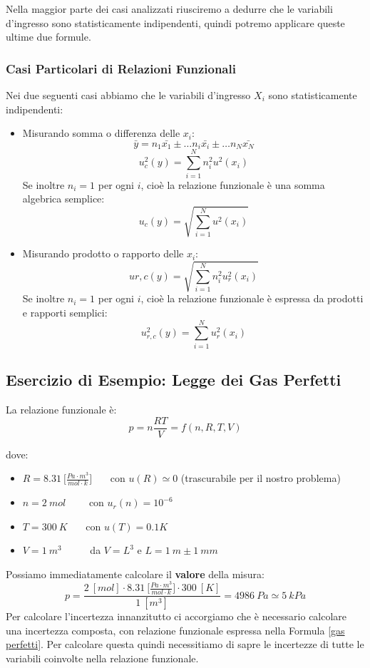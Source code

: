 \documentclass[a4paper,11pt]{report}
\begin{document}
Nella maggior parte dei casi analizzati riusciremo a dedurre che le variabili d'ingresso sono statisticamente indipendenti, quindi potremo applicare queste ultime due formule.
\subsubsection{Casi Particolari di Relazioni Funzionali}
Nei due seguenti casi abbiamo che le variabili d'ingresso $X_i$ sono statisticamente indipendenti:
\begin{itemize}
  \item Misurando somma o differenza delle $x_i$:
  $$
    \bar{y} = n_1\bar{x_1}\pm\ldots n_i\bar{x_i}\pm\ldots n_N\bar{x_N}
  $$
  $$
    u^2_c(y) = \sum^N_{i = 1}n_i^2 u^2(x_i)
  $$
  Se inoltre $n_i = 1$ per ogni $i$, cioè la relazione funzionale è una somma algebrica semplice:
  $$
    u_c(y) = \sqrt{\sum^N_{i = 1}u^2(x_i)}
  $$
  \item Misurando prodotto o rapporto delle $x_i$:
  $$
    u{r,c}(y) = \sqrt{\sum^{N}_{i = 1}n_i^2 u_r^2(x_i)}
  $$
    Se inoltre $n_i = 1$ per ogni $i$, cioè la relazione funzionale è espressa da prodotti e rapporti semplici:
    $$
      u_{r,c}^2(y) = \sum^{N}_{i = 1}u_r^2(x_i)
    $$
\end{itemize}
\subsection{Esercizio di Esempio: Legge dei Gas Perfetti}
La relazione funzionale è:
\begin{equation}
  \label{gas perfetti}
  p = n \frac{RT}{V} = f (n,R,T,V)
\end{equation}

dove:
\begin{itemize}
  \item $R = 8.31~\Bigg[\frac{Pa\cdot m^3}{mol\cdot k}\Bigg]$~~~ con $u(R) \simeq 0$ (trascurabile per il nostro problema)
  \item $n = 2~mol$~~~~ con $u_r(n) = 10^{-6}$
  \item $T = 300~K$~~~ con $u(T) = 0.1 K$
  \item $V = 1~m^3$~~~~~ da $V = L^3$ e $L = 1~m\pm 1~mm$
\end{itemize}
Possiamo immediatamente calcolare il \textbf{valore} della misura:
$$
  p = \frac{2~[mol]\cdot 8.31~\Bigg[\frac{Pa\cdot m^3}{mol\cdot k}\Bigg]\cdot 300~[K]}{1~[m^3]} = 4986~Pa \simeq 5~kPa
$$
Per calcolare l'incertezza innanzitutto ci accorgiamo che è necessario calcolare una incertezza composta, con relazione funzionale espressa nella Formula \ref{gas perfetti}. Per calcolare questa quindi necessitiamo di sapre le incertezze di tutte le variabili coinvolte nella relazione funzionale.
\end{document}
